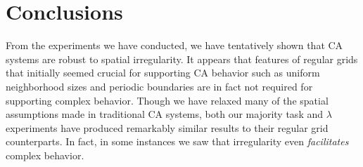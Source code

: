 \documentclass[a4paper,11pt]{article}
\begin{document}


\section{Conclusions}
\label{sec:Conclusion}
From the experiments we have conducted, we have tentatively shown that CA systems are robust to spatial irregularity. It appears that features of regular grids that initially seemed crucial for supporting CA behavior such as uniform neighborhood sizes and periodic boundaries are in fact not required for supporting complex behavior. Though we have relaxed many of the spatial assumptions made in traditional CA systems, both our majority task and $\lambda$ experiments have produced remarkably similar results to their regular grid counterparts. In fact, in some instances we saw that irregularity even \textit{facilitates} complex behavior.
\end{document}
